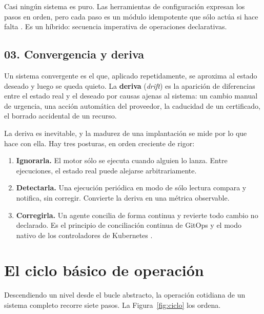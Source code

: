 \documentclass[11pt,letterpaper]{article}
\begin{document}
Casi ningún sistema es puro. Las herramientas de configuración expresan los
pasos en orden, pero cada paso es un módulo idempotente que sólo actúa si hace
falta \parencite{ansibledocs}. Es un híbrido: secuencia imperativa de
operaciones declarativas.

\subsection*{03. Convergencia y deriva}

Un sistema convergente es el que, aplicado repetidamente, se aproxima al
estado deseado y luego se queda quieto. La \textbf{deriva}
(\emph{drift}) es la aparición de diferencias entre el estado real y el
deseado por causas ajenas al sistema: un cambio manual de urgencia, una acción
automática del proveedor, la caducidad de un certificado, el borrado
accidental de un recurso.

La deriva es inevitable, y la madurez de una implantación se mide por lo que
hace con ella. Hay tres posturas, en orden creciente de rigor:

\begin{enumerate}
  \item \textbf{Ignorarla.} El motor sólo se ejecuta cuando alguien lo lanza.
    Entre ejecuciones, el estado real puede alejarse arbitrariamente.
  \item \textbf{Detectarla.} Una ejecución periódica en modo de sólo lectura
    compara y notifica, sin corregir. Convierte la deriva en una métrica
    observable.
  \item \textbf{Corregirla.} Un agente concilia de forma continua y revierte
    todo cambio no declarado. Es el principio de conciliación continua de
    GitOps \parencite{opengitops} y el modo nativo de los controladores de
    Kubernetes \parencite{k8scontrollers,burns2016}.
\end{enumerate}

\section{El ciclo básico de operación}

Descendiendo un nivel desde el bucle abstracto, la operación cotidiana de un
sistema completo recorre siete pasos. La Figura~\ref{fig:ciclo} los ordena.
\end{document}
